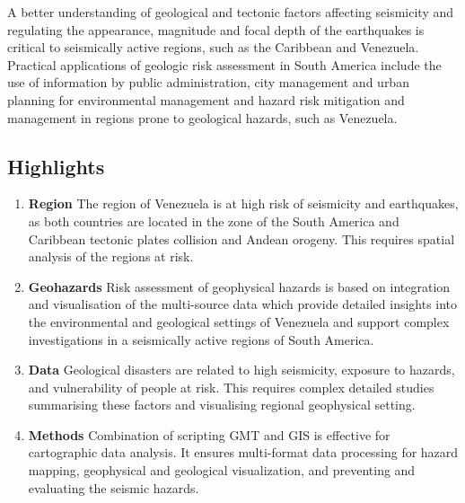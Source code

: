 \documentclass[sustainability,article,submit,pdftex,moreauthors]{Definitions/mdpi}
\begin{document}
A better understanding of geological and tectonic factors affecting seismicity and regulating the appearance, magnitude and focal depth of the earthquakes is critical to seismically active regions, such as the Caribbean and Venezuela. Practical applications of geologic risk assessment in South America include the use of information by public administration, city management and urban planning for environmental management and hazard risk mitigation and management in regions prone to geological hazards, such as Venezuela. 

\subsection{Highlights}

\begin{enumerate}
  \item \textbf{Region} The region of Venezuela is at high risk of seismicity and earthquakes, as both countries are located in the zone of the South America and Caribbean tectonic plates collision and Andean orogeny. This requires spatial analysis of the regions at risk.
  \item \textbf{Geohazards} Risk assessment of geophysical hazards is based on integration and visualisation of the multi-source data which provide detailed insights into the environmental and geological settings of Venezuela and support complex investigations in a seismically active regions of South America. 
    \item \textbf{Data} Geological disasters are related to high seismicity, exposure to hazards, and vulnerability of people at risk. This requires complex detailed studies summarising these factors and visualising regional geophysical setting.
   \item \textbf{Methods} Combination of scripting GMT and GIS is effective for cartographic data analysis. It ensures multi-format data processing for hazard mapping, geophysical and geological visualization, and preventing and evaluating the seismic hazards.
\end{enumerate}

\vspace{6pt} 

\end{document}
